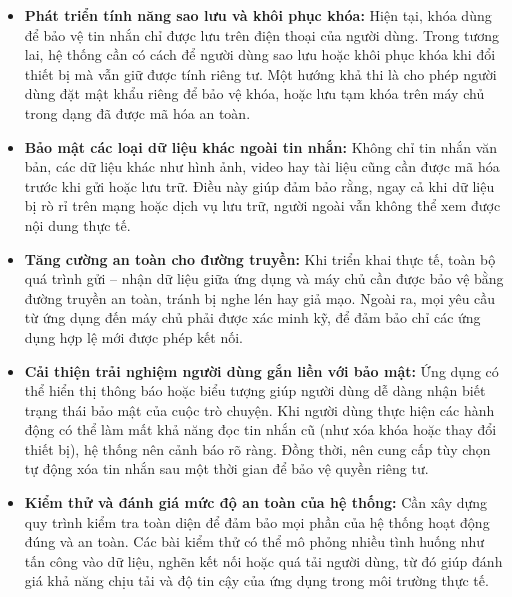 \begin{itemize}
  \item \textbf{Phát triển tính năng sao lưu và khôi phục khóa: } Hiện tại, khóa dùng để bảo vệ tin nhắn chỉ được lưu trên điện thoại của người dùng. Trong tương lai, hệ thống cần có cách để người dùng sao lưu hoặc khôi phục khóa khi đổi thiết bị mà vẫn giữ được tính riêng tư. Một hướng khả thi là cho phép người dùng đặt mật khẩu riêng để bảo vệ khóa, hoặc lưu tạm khóa trên máy chủ trong dạng đã được mã hóa an toàn.
  \item \textbf{Bảo mật các loại dữ liệu khác ngoài tin nhắn:} Không chỉ tin nhắn văn bản, các dữ liệu khác như hình ảnh, video hay tài liệu cũng cần được mã hóa trước khi gửi hoặc lưu trữ. Điều này giúp đảm bảo rằng, ngay cả khi dữ liệu bị rò rỉ trên mạng hoặc dịch vụ lưu trữ, người ngoài vẫn không thể xem được nội dung thực tế.
  \item \textbf{Tăng cường an toàn cho đường truyền: } Khi triển khai thực tế, toàn bộ quá trình gửi – nhận dữ liệu giữa ứng dụng và máy chủ cần được bảo vệ bằng đường truyền an toàn, tránh bị nghe lén hay giả mạo. Ngoài ra, mọi yêu cầu từ ứng dụng đến máy chủ phải được xác minh kỹ, để đảm bảo chỉ các ứng dụng hợp lệ mới được phép kết nối.
  \item \textbf{Cải thiện trải nghiệm người dùng gắn liền với bảo mật: } Ứng dụng có thể hiển thị thông báo hoặc biểu tượng giúp người dùng dễ dàng nhận biết trạng thái bảo mật của cuộc trò chuyện. Khi người dùng thực hiện các hành động có thể làm mất khả năng đọc tin nhắn cũ (như xóa khóa hoặc thay đổi thiết bị), hệ thống nên cảnh báo rõ ràng. Đồng thời, nên cung cấp tùy chọn tự động xóa tin nhắn sau một thời gian để bảo vệ quyền riêng tư.
  \item \textbf{Kiểm thử và đánh giá mức độ an toàn của hệ thống: } Cần xây dựng quy trình kiểm tra toàn diện để đảm bảo mọi phần của hệ thống hoạt động đúng và an toàn. Các bài kiểm thử có thể mô phỏng nhiều tình huống như tấn công vào dữ liệu, nghẽn kết nối hoặc quá tải người dùng, từ đó giúp đánh giá khả năng chịu tải và độ tin cậy của ứng dụng trong môi trường thực tế.
\end{itemize}
